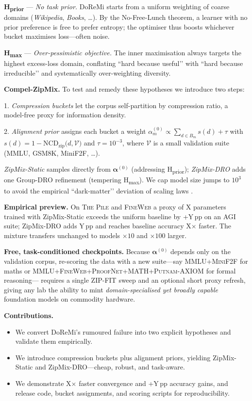 \documentclass{article}
\begin{document}
\textbf{H\textsubscript{prior}} — \emph{No task prior.}  
DoReMi starts from a uniform weighting of coarse domains
(\emph{Wikipedia}, \emph{Books}, …).  
By the No-Free-Lunch theorem, a learner with no prior preference is free
to prefer entropy; the optimiser thus boosts whichever bucket maximises
loss—often noise.

\textbf{H\textsubscript{max}} — \emph{Over-pessimistic objective.}  
The inner maximisation always targets the highest excess-loss domain,
conflating “hard because useful’’ with “hard because irreducible’’ and
systematically over-weighting diversity.

\medskip
\textbf{Compel-ZipMix.}  
To test and remedy these hypotheses we introduce two steps:

1. \emph{Compression buckets} let the corpus self-partition by compression
   ratio, a model-free proxy for information density.

2. \emph{Alignment prior} assigns each bucket a weight
   $\alpha^{(0)}_m\propto\sum_{d\in B_m}s(d)+\tau$ with
   $s(d)=1-\text{NCD}_{\text{zip}}\bigl(d,\mathcal{V}\bigr)$ and
   $\tau=10^{-3}$, where $\mathcal{V}$ is a small validation suite
   (MMLU, GSM8K, MiniF2F, …).

\emph{ZipMix-Static} samples directly from $\boldsymbol{\alpha}^{(0)}$
(addressing H\textsubscript{prior});  
\emph{ZipMix-DRO} adds one Group-DRO refinement (tempering
H\textsubscript{max}).  
We cap model size jumps to $10^{3}$ to avoid the empirical
“dark-matter’’ deviation of scaling laws
\citep{gpt4report,schaeffer2025darkmatter}.

\medskip
\textbf{Empirical preview.}  
On \textsc{The Pile} and \textsc{FineWeb} a proxy of X parameters trained
with ZipMix-Static exceeds the uniform baseline by +Y\,pp on an AGI
suite; ZipMix-DRO adds Y\,pp and reaches baseline accuracy X× faster.
The mixture transfers unchanged to models $\times10$ and $\times100$
larger.

\medskip
\textbf{Free, task-conditioned checkpoints.}  
Because $\boldsymbol{\alpha}^{(0)}$ depends only on the validation corpus,
re-scoring the data with a new suite—say
\textsc{MMLU+MiniF2F} for maths or
\textsc{MMLU+FineWeb+ProofNet+MATH+Putnam-AXIOM} for formal reasoning—
requires a single ZIP-FIT sweep and an optional short proxy refresh,
giving any lab the ability to mint \emph{domain-specialised yet broadly
capable} foundation models on commodity hardware.

\medskip
\textbf{Contributions.}
\begin{itemize}[leftmargin=1.15em,topsep=0pt,itemsep=0pt]
\item We convert DoReMi’s rumoured failure into two explicit hypotheses
      and validate them empirically.
\item We introduce compression buckets plus alignment priors, yielding
      ZipMix-Static and ZipMix-DRO—cheap, robust, and task-aware.
\item We demonstrate X× faster convergence and +Y\,pp accuracy gains, and
      release code, bucket assignments, and scoring scripts for
      reproducibility.
\end{itemize}
\end{document}
